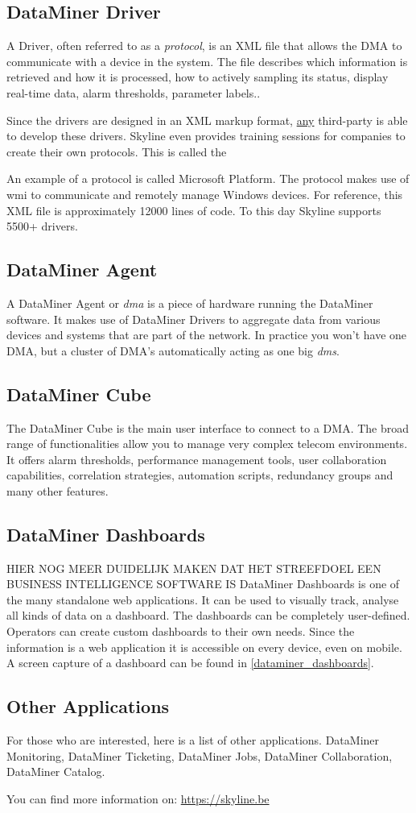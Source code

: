 \subsection{DataMiner Driver}
A Driver, often referred to as a \textit{protocol}, is an XML file that allows the DMA to communicate with a device in the system. The file describes which information is retrieved and how it is processed, how to actively sampling its status, display real-time data, alarm thresholds, parameter labels..

Since the drivers are designed in an XML markup format, \underline{any} third-party is able to develop these drivers. Skyline even provides training sessions for companies to create their own protocols. This is called the  

An example of a protocol is called Microsoft Platform. The protocol makes use of \gls{wmi} to communicate and remotely manage Windows devices. For reference, this XML file is approximately 12000 lines of code. To this day Skyline supports 5500+ drivers. 


\subsection{DataMiner Agent}

A DataMiner Agent or \textit{\gls{dma}} is a piece of hardware running the DataMiner software. It makes use of DataMiner Drivers to aggregate data from various devices and systems that are part of the network. In practice you won't have one DMA, but a cluster of DMA's automatically acting as one big \textit{\gls{dms}}.  

\subsection{DataMiner Cube}
The DataMiner Cube is the main user interface to connect to a DMA. The broad range of functionalities allow you to manage very complex telecom environments. It offers alarm thresholds, performance management tools, user collaboration capabilities, correlation strategies,  automation scripts, redundancy groups and many other features. 

\subsection{DataMiner Dashboards}\label{dataminer-dashboards-information}
HIER NOG MEER DUIDELIJK MAKEN DAT HET STREEFDOEL EEN BUSINESS INTELLIGENCE SOFTWARE IS
 DataMiner Dashboards is one of the many standalone web applications.
 It can be used to visually track, analyse all kinds of data on a dashboard. The dashboards can be completely user-defined. Operators can create custom dashboards to their own needs. Since the information is a web application it is accessible on every device, even on mobile. A screen capture of a dashboard can be found in \autoref{dataminer_dashboards}.
 
 
\subsection{Other Applications}
For those who are interested, here is a list of other applications. DataMiner Monitoring, DataMiner Ticketing, DataMiner Jobs, DataMiner Collaboration, DataMiner Catalog. 

You can find more information on: \url{https://skyline.be}

